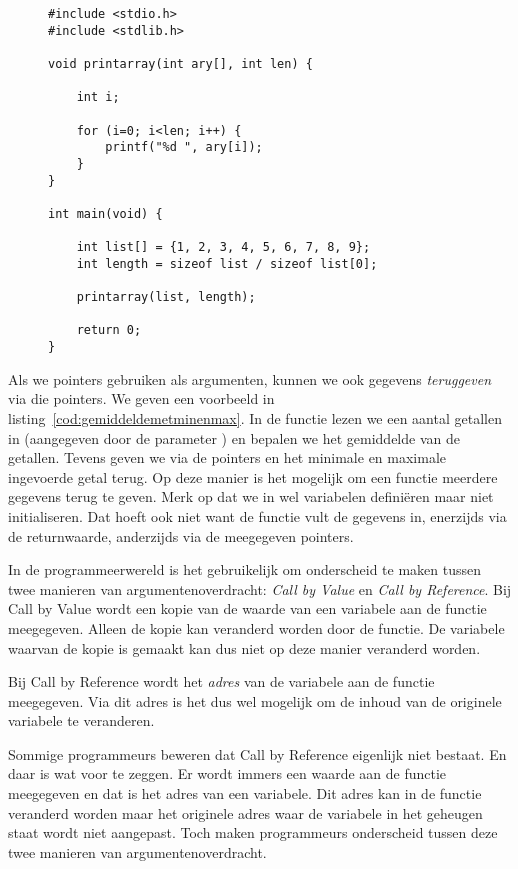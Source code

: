 \begin{figure}[!ht]
\begin{lstlisting}[caption=Meegeven van de grootte van een array.,label=cod:poilengthpass]
#include <stdio.h>
#include <stdlib.h>

void printarray(int ary[], int len) {

    int i;

    for (i=0; i<len; i++) {
        printf("%d ", ary[i]);
    }
}

int main(void) {

    int list[] = {1, 2, 3, 4, 5, 6, 7, 8, 9};
    int length = sizeof list / sizeof list[0];

    printarray(list, length);

    return 0;
}
\end{lstlisting}
\end{figure}

Als we pointers gebruiken als argumenten, kunnen we ook gegevens \textsl{teruggeven} via die pointers. We geven een voorbeeld in listing~\ref{cod:gemiddeldemetminenmax}. In de functie  lezen we een aantal getallen in (aangegeven door de parameter ) en bepalen we het gemiddelde van de getallen. Tevens geven we via de pointers  en  het minimale en maximale ingevoerde getal terug. Op deze manier is het mogelijk om een functie meerdere gegevens terug te geven. Merk op dat we in  wel variabelen definiëren maar niet initialiseren. Dat hoeft ook niet want de functie vult de gegevens in, enerzijds via de returnwaarde, anderzijds via de meegegeven pointers. 


\begin{infobox}
%
In de programmeerwereld is het gebruikelijk om onderscheid te maken tussen twee manieren van argumentenoverdracht: \textsl{Call by Value} en \textsl{Call by Reference}. Bij Call by Value wordt een kopie van de waarde van een variabele aan de functie meegegeven. Alleen de kopie kan veranderd worden door de functie. De variabele waarvan de kopie is gemaakt kan dus niet op deze manier veranderd worden.

Bij Call by Reference wordt het \textsl{adres} van de variabele aan de functie meegegeven. Via dit adres is het dus wel mogelijk om de inhoud van de originele variabele te veranderen.

Sommige programmeurs beweren dat Call by Reference eigenlijk niet bestaat. En daar is wat voor te zeggen. Er wordt immers een waarde aan de functie meegegeven en dat is het adres van een variabele. Dit adres kan in de functie veranderd worden maar het originele adres waar de variabele in het geheugen staat wordt niet aangepast. Toch maken programmeurs onderscheid tussen deze twee manieren van argumentenoverdracht.
\end{infobox}


